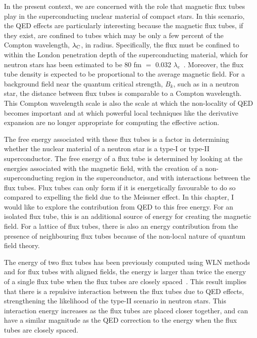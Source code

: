 In the present context, we are concerned with the role that magnetic 
flux tubes play in the superconducting nuclear material of compact stars.
In this scenario, the \ac{QED} effects are particularly interesting because 
the magnetic flux tubes, if they exist, are confined to tubes which may be 
only a few percent of the Compton wavelength, $\lambda_{\rm C}$, in radius. Specifically, 
the flux must be confined to within the London penetration depth of the superconducting 
material, which for neutron stars has been estimated to be 80 fm $=$
0.032 $\lambda_e$~\cite{PhysRevLett.91.101101}. Moreover, the 
flux tube density is expected to be proportional to the 
average magnetic field. For a background field near the quantum critical 
strength, $B_k$, such as in a neutron star, the distance between flux tubes 
is comparable to a Compton wavelength. This Compton wavelength scale is 
also the scale at which the non-locality of \ac{QED} becomes important and 
at which powerful local techniques like the derivative expansion 
are no longer appropriate for computing the effective action.

The free energy associated with these flux tubes is a factor in determining 
whether the nuclear material of a neutron star is a type-I or type-II 
superconductor. The free energy of a flux tube is determined by 
looking at the energies associated with the magnetic field, with the 
creation of a non-superconducting region in the superconductor, and 
with interactions between the flux tubes. Flux tubes can only form 
if it is energetically favourable to do so compared to expelling the 
field due to the Meissner effect. In this chapter, I would 
like to explore the contribution from \ac{QED} to this free 
energy. For an isolated flux tube, this is an additional source 
of energy for creating the magnetic field. For a lattice of 
flux tubes, there is also an energy contribution from the 
presence of neighbouring flux tubes because of the non-local 
nature of quantum field theory.

The energy of two flux tubes has been previously
computed using \ac{WLN} methods and for flux tubes with aligned fields, the 
energy is larger than twice the energy of a single flux tube when the flux tubes 
are closely spaced~\cite{Langfeld:2002vy}. This result implies that there is a 
repulsive interaction between the flux tubes due to \ac{QED} effects,
strengthening the likelihood of the type-II scenario in neutron stars. This interaction 
energy increases as the flux tubes are placed closer together, and can have a similar 
magnitude as the \ac{QED} correction to the energy when the flux tubes are closely spaced.


